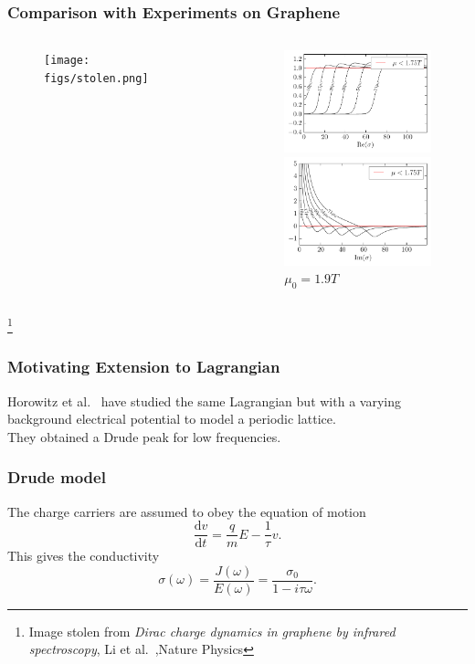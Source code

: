 \documentclass{beamer}
\renewcommand{\d}{\ensuremath{\mathrm{d}}}
\renewcommand{\i}{\ensuremath{i}}
\begin{document}
\begin{frame}
\frametitle{Comparison with Experiments on Graphene}
\begin{columns}
\begin{column}{6cm}
\begin{figure}
\centering
\texttt{[image: figs/stolen.png]}
\end{figure}
\end{column}
\begin{column}{6cm}
\begin{figure}
\centering
\includegraphics[width=4.5cm]{figs/graphene2_cond_re_a2_0.0.pdf}\\
\includegraphics[width=4.5cm]{figs/graphene2_cond_im_a2_0.0.pdf}\\
$\mu_0=1.9T$
\end{figure}
\end{column}
\end{columns}
\footnote{Image stolen from \emph{Dirac charge dynamics in graphene by infrared spectroscopy}, Li et al.~,Nature Physics}
\end{frame}

\begin{frame}
\frametitle{Motivating Extension to Lagrangian}
Horowitz et al.~\cite{horowitz} have studied the same Lagrangian but with a varying background electrical potential to model a periodic lattice.\\
\vspace{1cm }
They obtained a Drude peak for low frequencies.
\end{frame}

\begin{frame}
\frametitle{Drude model}
The charge carriers are assumed to obey the equation of motion
\begin{equation}
 \frac{\d v}{\d t}=\frac{q}{m}E-\frac{1}{\tau}v.
\end{equation}
This gives the conductivity
\begin{equation}
  \sigma(\omega)=\frac{J(\omega)}{E(\omega)}=\frac{\sigma_0}{1-\i\tau\omega}.
\end{equation}
\end{frame}
\end{document}
